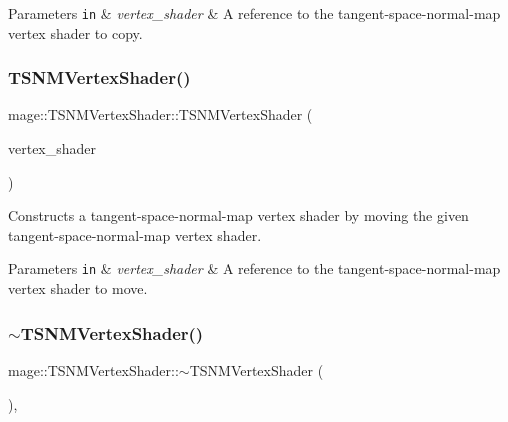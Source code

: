 \begin{DoxyParams}[1]{Parameters}
\mbox{\tt in}  & {\em vertex\+\_\+shader} & A reference to the tangent-\/space-\/normal-\/map vertex shader to copy. \\
\hline
\end{DoxyParams}
\hypertarget{classmage_1_1_t_s_n_m_vertex_shader_a3c4a072e8a907437e4dfc15835253da5}{}\label{classmage_1_1_t_s_n_m_vertex_shader_a3c4a072e8a907437e4dfc15835253da5} 
\subsubsection{\texorpdfstring{T\+S\+N\+M\+Vertex\+Shader()}{TSNMVertexShader()}\hspace{0.1cm}{\footnotesize\ttfamily [6/6]}}
{\footnotesize\ttfamily mage\+::\+T\+S\+N\+M\+Vertex\+Shader\+::\+T\+S\+N\+M\+Vertex\+Shader (\begin{DoxyParamCaption}\item[{\hyperlink{classmage_1_1_t_s_n_m_vertex_shader}{T\+S\+N\+M\+Vertex\+Shader} \&\&}]{vertex\+\_\+shader }\end{DoxyParamCaption})\hspace{0.3cm}{\ttfamily [default]}}

Constructs a tangent-\/space-\/normal-\/map vertex shader by moving the given tangent-\/space-\/normal-\/map vertex shader.


\begin{DoxyParams}[1]{Parameters}
\mbox{\tt in}  & {\em vertex\+\_\+shader} & A reference to the tangent-\/space-\/normal-\/map vertex shader to move. \\
\hline
\end{DoxyParams}
\hypertarget{classmage_1_1_t_s_n_m_vertex_shader_ac753a201fc0c12978811cca636da107e}{}\label{classmage_1_1_t_s_n_m_vertex_shader_ac753a201fc0c12978811cca636da107e} 
\subsubsection{\texorpdfstring{$\sim$\+T\+S\+N\+M\+Vertex\+Shader()}{~TSNMVertexShader()}}
{\footnotesize\ttfamily mage\+::\+T\+S\+N\+M\+Vertex\+Shader\+::$\sim$\+T\+S\+N\+M\+Vertex\+Shader (\begin{DoxyParamCaption}{ }\end{DoxyParamCaption})\hspace{0.3cm}{\ttfamily [virtual]}, {\ttfamily [default]}}

